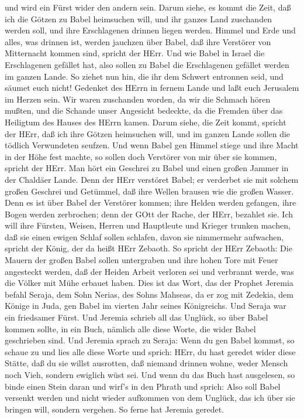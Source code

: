und wird ein Fürst wider den andern sein.  Darum siehe, es
kommt die Zeit, daß ich die Götzen zu Babel heimsuchen will, und ihr
ganzes Land zuschanden werden soll, und ihre Erschlagenen drinnen liegen
werden.  Himmel und Erde und alles, was drinnen ist, werden
jauchzen über Babel, daß ihre Verstörer von Mitternacht kommen sind,
spricht der HErr.  Und wie Babel in Israel die Erschlagenen
gefället hat, also sollen zu Babel die Erschlagenen gefället werden im
ganzen Lande.  So ziehet nun hin, die ihr dem Schwert
entronnen seid, und säumet euch nicht! Gedenket des HErrn in fernem
Lande und laßt euch Jerusalem im Herzen sein.  Wir waren
zuschanden worden, da wir die Schmach hören mußten, und die Schande
unser Angesicht bedeckte, da die Fremden über das Heiligtum des Hauses
des HErrn kamen.  Darum siehe, die Zeit kommt, spricht der
HErr, daß ich ihre Götzen heimsuchen will, und im ganzen Lande sollen
die tödlich Verwundeten seufzen.  Und wenn Babel gen Himmel
stiege und ihre Macht in der Höhe fest machte, so sollen doch Verstörer
von mir über sie kommen, spricht der HErr.  Man hört ein
Geschrei zu Babel und einen großen Jammer in der Chaldäer Lande.
 Denn der HErr verstöret Babel; er verderbet sie mit
solchem großen Geschrei und Getümmel, daß ihre Wellen brausen wie die
großen Wasser.  Denn es ist über Babel der Verstörer
kommen; ihre Helden werden gefangen, ihre Bogen werden zerbrochen; denn
der GOtt der Rache, der HErr, bezahlet sie.  Ich will ihre
Fürsten, Weisen, Herren und Hauptleute und Krieger trunken machen, daß
sie einen ewigen Schlaf sollen schlafen, davon sie nimmermehr aufwachen,
spricht der König, der da heißt HErr Zebaoth.  So spricht
der HErr Zebaoth: Die Mauern der großen Babel sollen untergraben und
ihre hohen Tore mit Feuer angesteckt werden, daß der Heiden Arbeit
verloren sei und verbrannt werde, was die Völker mit Mühe erbauet haben.
 Dies ist das Wort, das der Prophet Jeremia befahl Seraja,
dem Sohn Nerias, des Sohns Mahseas, da er zog mit Zedekia, dem Könige in
Juda, gen Babel im vierten Jahr seines Königreichs. Und Seraja war ein
friedsamer Fürst.  Und Jeremia schrieb all das Unglück, so
über Babel kommen sollte, in ein Buch, nämlich alle diese Worte, die
wider Babel geschrieben sind.  Und Jeremia sprach zu
Seraja: Wenn du gen Babel kommst, so schaue zu und lies alle diese Worte
 und sprich: HErr, du hast geredet wider diese Stätte, daß
du sie willst ausrotten, daß niemand drinnen wohne, weder Mensch noch
Vieh, sondern ewiglich wüst sei.  Und wenn du das Buch hast
ausgelesen, so binde einen Stein daran und wirf's in den Phrath
 und sprich: Also soll Babel versenkt werden und nicht
wieder aufkommen von dem Unglück, das ich über sie bringen will, sondern
vergehen. So ferne hat Jeremia geredet.

